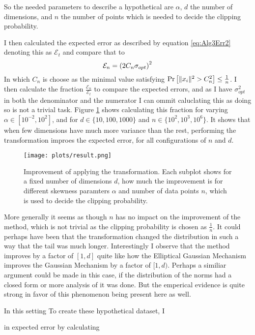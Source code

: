 \documentclass[a4paper,12pt]{article}
\begin{document}
So the needed parameters to describe a hypothetical are $\alpha$, $d$ the number of dimensions, and 
$n$ the number of points which is needed to decide the clipping probability.

I then calculated the expected error as described by equation 
\eqref{eq:Alg3Err2} denoting this as $\mathcal{E}_t$ and compare that to
\[
    \mathcal{E}_n = \left (2C_n\sigma_{opt}\right)^2
\]
In which $C_n$ is choose as the minimal value satisfying 
$\Pr\left [ \|x_i\|^2 > C_n^2 \right] \le \frac{1}{n}$. 
I then calculate the fraction $\frac{\mathcal{E}_n}{\mathcal{E}_t}$ to compare 
the expected errors, and as I have $\sigma_{opt}^2$ in both the denominator and the numerator I 
can ommit caluclating this as doing so is not a trivial task. 
Figure \ref{fig:result} shows calculating this fraction for varying $\alpha \in [10^{-2}, 10^2]$, and for 
$d \in \{10, 100, 1000\}$ and $n \in \{10^2, 10^3, 10^6\}$.
It shows that when few dimensions have much more variance than the rest,
performing the transformation improes the expected error, for all 
configurations of $n$ and $d$.
\begin{figure}[h!]
\label{fig:result}
\texttt{[image: plots/result.png]}
\caption{Improvement of applying the transformation. 
Each subplot shows for a fixed number of dimensions $d$, how much the improvement is for different 
skewness paramters $\alpha$ and number of data points $n$,
 which is used to decide the clipping probability.}
\end{figure}



More generally it seems as though $n$ has no impact on the improvement of the method, 
which is not trivial as the clipping probability is chosen as $\frac{1}{n}$. 
It could perhaps have been that the transformation changed the distribution in such a way
that the tail was much longer.
Interestingly I observe that the method improves by a factor of $[1,d]$ 
quite like how the Elliptical Gaussian Mechanism improves the Gaussian Mechanism by a 
factor of $[1,d)$. Perhaps a similiar argument could be made in this case, 
if the distribution of the norms had a closed form or more analysis of it was done.
But the emperical evidence is quite strong in favor of this phenomenon being present here as well.




In this setting To create these hypothetical dataset, I 


in expected error by calculating 
\end{document}
